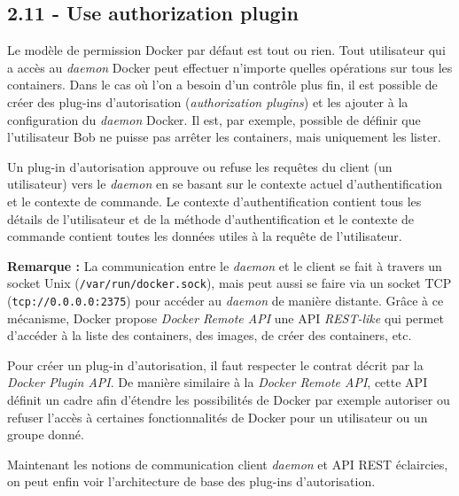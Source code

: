 \documentclass[11pt,a4paper,oneside]{report}
\newcommand{\code}[1]{\texttt{#1}}
\begin{document}
\subsection{2.11 - Use authorization plugin}
Le modèle de permission Docker par défaut est tout ou rien. Tout utilisateur qui a accès au \textit{daemon} Docker peut effectuer n'importe quelles opérations sur tous les containers. Dans le cas où l'on a besoin d'un contrôle plus fin, il est possible de créer des plug-ins d'autorisation (\textit{authorization plugins}) et les ajouter à la configuration du \textit{daemon} Docker. Il est, par exemple, possible de définir que l'utilisateur Bob ne puisse pas arrêter les containers, mais uniquement les lister.

Un plug-in d'autorisation approuve ou refuse les requêtes du client (un utilisateur)  vers le \textit{daemon} en se basant sur le contexte actuel d'authentification et le contexte de commande. Le contexte d'authentification contient tous les détails de l'utilisateur et de la méthode d'authentification et le contexte de commande contient toutes les données utiles à la requête de l'utilisateur.

\textbf{Remarque : } La communication entre le \textit{daemon} et le client\cite{docker_doc_daemon} se fait à travers un socket Unix (\code{/var/run/docker.sock}), mais peut aussi se faire via un socket TCP (\code{tcp://0.0.0.0:2375}) pour accéder au \textit{daemon} de manière distante. Grâce à ce mécanisme, Docker propose \textit{Docker Remote API}\cite{docker_doc_remote_api} une API \textit{REST-like} qui permet d'accéder à la liste des containers, des images, de créer des containers, etc.

Pour créer un plug-in d'autorisation, il faut respecter le contrat décrit par la \textit{Docker Plugin API}. De manière similaire à la \textit{Docker Remote API}, cette API définit un cadre afin d'étendre les possibilités de Docker par exemple autoriser ou refuser l'accès à certaines fonctionnalités de Docker pour un utilisateur ou un groupe donné.


Maintenant les notions de communication client \textit{daemon} et API REST éclaircies, on peut enfin voir l'architecture de base des plug-ins d'autorisation.
\end{document}
